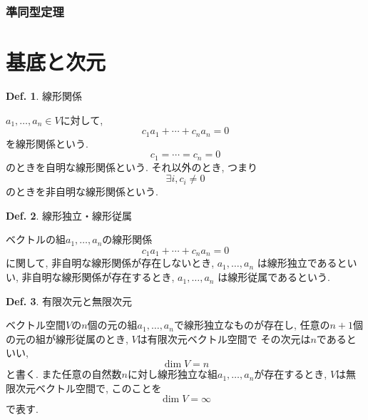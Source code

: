 \documentclass[a4paper,10pt,report]{amsart}
\theoremstyle{plain}
\theoremstyle{definition}
\newtheorem{defn}{Def.}[section]
\theoremstyle{remark}
\begin{document}
\section{準同型定理}
\part{基底と次元}
\begin{leftbar}
    \begin{defn}線形関係\par
        \(a_{1},\ldots,a_{n}\in V\)に対して, 
        \begin{equation}
            c_{1}a_{1}+\cdots+c_{n}a_{n}=0
        \end{equation}
        を線形関係という. 
        \begin{equation}
            c_{1}=\cdots=c_{n}=0
        \end{equation}
        のときを自明な線形関係という. それ以外のとき, つまり
        \begin{equation}
            \exists i,c_{i}\neq 0
        \end{equation}
        のときを非自明な線形関係という. 
    \end{defn}
\end{leftbar}
\begin{leftbar}
    \begin{defn}線形独立・線形従属\par
        ベクトルの組\(a_{1},\ldots,a_{n}\)の線形関係
        \begin{equation}
            c_{1}a_{1}+\cdots+c_{n}a_{n}=0
        \end{equation}
        に関して, 非自明な線形関係が存在しないとき, \(a_{1},\ldots,a_{n}\)
        は線形独立であるといい, 非自明な線形関係が存在するとき, \(a_{1},\ldots,a_{n}\)
        は線形従属であるという. 
    \end{defn}
\end{leftbar}
\begin{leftbar}
    \begin{defn}有限次元と無限次元\par
        ベクトル空間\(V\)の\(n\)個の元の組\(a_{1},\ldots,a_{n}\)で線形独立なものが存在し, 
        任意の\(n+1\)個の元の組が線形従属のとき, \(V\)は有限次元ベクトル空間で
        その次元は\(n\)であるといい, 
        \begin{equation}
            \dim{V}=n
        \end{equation}
        と書く. また任意の自然数\(n\)に対し線形独立な組\(a_{1},\ldots,a_{n}\)が存在するとき, 
        \(V\)は無限次元ベクトル空間で, このことを
        \begin{equation}
            \dim{V}=\infty
        \end{equation}
        で表す. 
    \end{defn}
\end{leftbar}
\end{document}
